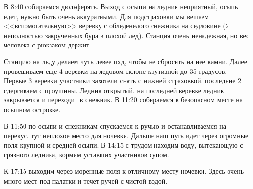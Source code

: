 В 8:40 собираемся дюльферять. Выход с осыпи на ледник неприятный, осыпь едет, нужно быть очень аккуратными. Для подстраховки мы вешаем <<вспомогательную>> веревку с обледенелого снежника на седловине (2 неполностью закрученных бура в плохой лед). Станция очень ненадежная, но вес человека с рюкзаком держит.

Станцию на льду делаем чуть левее пхд, чтобы не сбросить на нее камни. Далее провешиваем еще 4 веревки на ледовом склоне крутизной до 35 градусов. Первые 3 веревки участники захотели снять с нижней страховкой, последние 2 сдергиваем с проушины. Ледник открытый, на последней веревке ледник закрывается и переходит в снежник. В 11:20 собираемся в безопасном месте на осыпном островке.

В 11:50 по осыпи и снежникам спускаемся к ручью и останавливаемся на перекус. тут неплохое место для ночевки. Дальше наш путь идет через огромные поля крупной и средней осыпи. В 14:15 с трудом находим воду, вытекающую с грязного ледника, кормим уставших участников супом.

К 17:15 выходим через моренные поля к отличному месту ночевки. Здесь очень много мест под палатки и течет ручей с чистой водой.














